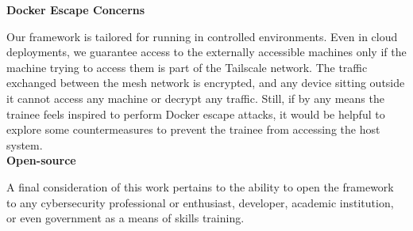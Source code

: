 \textbf{Docker Escape Concerns}

Our framework is tailored for running in controlled environments. Even in cloud deployments, we guarantee access to the externally accessible machines only if the machine trying to access them is part of the Tailscale network. The traffic exchanged between the mesh network is encrypted, and any device sitting outside it cannot access any machine or decrypt any traffic. Still, if by any means the trainee feels inspired to perform Docker escape attacks, it would be helpful to explore some countermeasures to prevent the trainee from accessing the host system.\\

\textbf{Open-source}

A final consideration of this work pertains to the ability to open the framework to any cybersecurity professional or enthusiast, developer, academic institution, or even government as a means of skills training.
